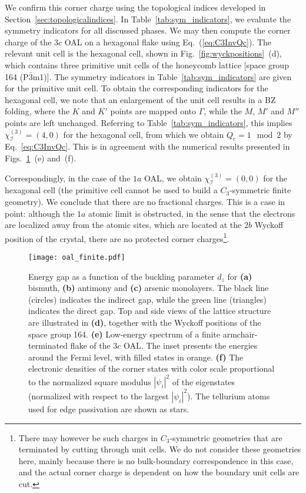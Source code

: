 We confirm this corner charge using the topological indices developed in Section~\ref{sec:topologicalindices}. In Table~\ref{tab:sym_indicators}, we evaluate the symmetry indicators for all discussed phases. We may then compute the corner charge of the $3c$ OAL on a hexagonal flake using Eq.~(\ref{eq:C3InvQc}). The relevant unit cell is the hexagonal cell, shown in Fig.~\ref{fig:wyckpositions}~(d), which contains three primitive unit cells of the honeycomb lattice [space group 164 (P$\bar{3}$m1)]. The symmetry indicators in Table~\ref{tab:sym_indicators} are given for the primitive unit cell. To obtain the corresponding indicators for the hexagonal cell, we note that an enlargement of the unit cell results in a BZ folding, where the $K$ and $K'$ points are mapped onto $\Gamma$, while the $M$, $M'$ and $M''$ points are left unchanged. Referring to Table~\ref{tab:sym_indicators}, this implies $\chi^{(3)}_{\mathcal{I}} = (4,0)$ for the hexagonal cell, from which we obtain $Q_c = 1 \mod 2$ by Eq.~\eqref{eq:C3InvQc}. This is in agreement with the numerical results presented in Figs.~\ref{fig:oal_finite}~(e) and~(f).

Correspondingly, in the case of the $1a$ OAL, we obtain $\chi^{(3)}_{\mathcal{I}} = (0,0)$ for the hexagonal cell (the primitive cell cannot be used to build a $C_3$-symmetric finite geometry). We conclude that there are no fractional charges. This is a case in point: although the $1a$ atomic limit is obstructed, in the sense that the electrons are localized away from the atomic sites, which are located at the $2b$ Wyckoff position of the crystal, there are no protected corner charges\footnote{There may however be such charges in $C_3$-symmetric geometries that are terminated by cutting through unit cells. We do not consider these geometries here, mainly because there is no bulk-boundary correspondence in this case, and the actual corner charge is dependent on how the boundary unit cells are cut.}.

\begin{figure}
\centering
\texttt{[image: oal\_finite.pdf]}
\caption[Energy gap as a function of the buckling parameter $d_z$, the Wyckoff positions of the space group 164, and results for a finite armchair-terminated flake of the $3c$ OAL]{Energy gap as a function of the buckling parameter $d_z$ for \textbf{(a)} bismuth, \textbf{(b)} antimony and \textbf{(c)} arsenic monolayers. The black line (circles) indicates the indirect gap, while the green line (triangles) indicates the direct gap. Top and side views of the lattice structure are illustrated in \textbf{(d)}, together with the Wyckoff positions of the space group 164. \textbf{(e)} Low-energy spectrum of a finite armchair-terminated flake of the $3c$ OAL. The inset presents the energies around the Fermi level, with filled states in orange. \textbf{(f)} The electronic densities of the corner states with color scale proportional to the normalized square modulus $|\psi_i|^2$ of the eigenstates (normalized with respect to the largest $|\psi_i|^2$). The tellurium atoms used for edge passivation are shown as stars.}
\label{fig:oal_finite}
\end{figure}


